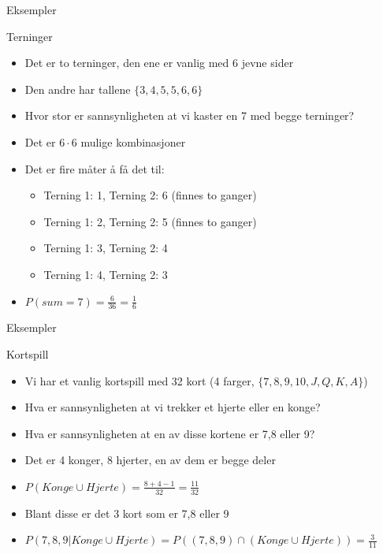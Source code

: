 \begin{frame}{Eksempler}
\begin{block}{Terninger}
\begin{itemize}[<+->]
\item Det er to terninger, den ene er vanlig med 6 jevne sider
\item Den andre har tallene $\{3,4,5,5,6,6\}$
\item Hvor stor er sannsynligheten at vi kaster en 7 med begge terninger?
\item Det er $6\cdot 6$ mulige kombinasjoner
\item Det er fire måter å få det til:
\begin{itemize}
\item Terning 1: 1, Terning 2: 6 (finnes to ganger)
\item Terning 1: 2, Terning 2: 5 (finnes to ganger)
\item Terning 1: 3, Terning 2: 4
\item Terning 1: 4, Terning 2: 3
\end{itemize}
\item $P(sum=7)=\frac{6}{36}=\frac{1}{6}$
\end{itemize}
\end{block}
\end{frame}

\begin{frame}{Eksempler}
\begin{block}{Kortspill}
\begin{itemize}[<+->]
\item Vi har et vanlig kortspill med 32 kort (4 farger, $\{7,8,9,10,J,Q,K,A\}$)
\item Hva er sannsynligheten at vi trekker et hjerte eller en konge?
\item Hva er sannsynligheten at en av disse kortene er 7,8 eller 9?
\item Det er 4 konger, 8 hjerter, en av dem er begge deler
\item $P(Konge\cup Hjerte)=\frac{8+4-1}{32}=\frac{11}{32}$
\item Blant disse er det 3 kort som er 7,8 eller 9
\item $P(7,8,9|Konge\cup Hjerte)=P((7,8,9)\cap(Konge\cup Hjerte))=\frac{3}{11}$
\end{itemize}
\end{block}
\end{frame}

